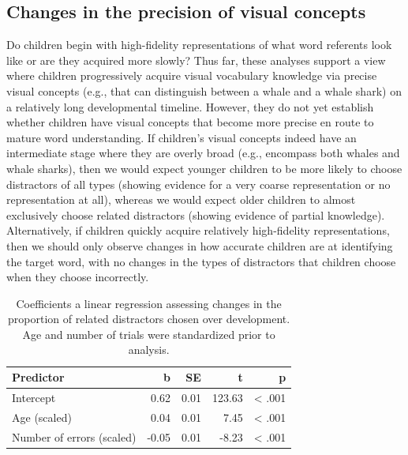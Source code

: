 \documentclass[
  man,mask]{apa6}
\begin{document}
\subsection{Changes in the precision of visual concepts}\label{changes-in-the-precision-of-visual-concepts}

Do children begin with high-fidelity representations of what word referents look like or are they acquired more slowly? Thus far, these analyses support a view where children progressively acquire visual vocabulary knowledge via precise visual concepts (e.g., that can distinguish between a whale and a whale shark) on a relatively long developmental timeline. However, they do not yet establish whether children have visual concepts that become more precise en route to mature word understanding. If children's visual concepts indeed have an intermediate stage where they are overly broad (e.g., encompass both whales and whale sharks), then we would expect younger children to be more likely to choose distractors of all types (showing evidence for a very coarse representation or no representation at all), whereas we would expect older children to almost exclusively choose related distractors (showing evidence of partial knowledge). Alternatively, if children quickly acquire relatively high-fidelity representations, then we should only observe changes in how accurate children are at identifying the target word, with no changes in the types of distractors that children choose when they choose incorrectly.

\begin{table}
\centering
\caption{\label{tab:unnamed-chunk-20}Coefficients a linear regression assessing changes in the proportion of related distractors chosen over development. Age and number of trials were standardized prior to analysis.}
\centering
\begin{tabular}[t]{lrrrr}
\toprule
Predictor & b & SE & t & p\\
\midrule
Intercept & 0.62 & 0.01 & 123.63 & < .001\\
Age (scaled) & 0.04 & 0.01 & 7.45 & < .001\\
Number of errors (scaled) & -0.05 & 0.01 & -8.23 & < .001\\
\bottomrule
\end{tabular}
\end{table}
\end{document}
